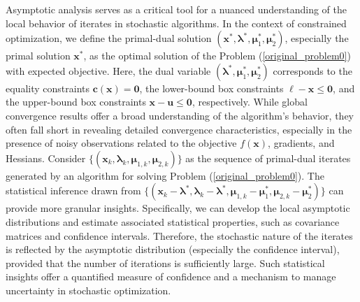 \documentclass[aos]{imsart}
\numberwithin{equation}{section}
\theoremstyle{plain}
\newcommand{\michael}[1]{\textcolor{red}{Michael:\ #1}}
\newcommand{\yihang}[1]{\textcolor{blue}{Yihang:\ #1}}
\begin{document}
Asymptotic analysis serves as a critical tool for a nuanced understanding of the local behavior of iterates in stochastic algorithms. In the context of constrained optimization, we define the primal-dual solution $(\bm{x}^{*}, \bm{\lambda}^{*}, \bm{\mu}_1^{*}, \bm{\mu}_2^{*})$, especially the primal solution $\bm{x}^{*}$, as the optimal solution of the Problem (\ref{original_problem0}) with expected objective. 
Here, the dual variable $(\bm{\lambda}^{*}, \bm{\mu}_1^{*}, \bm{\mu}_2^{*})$ corresponds to the equality constraints $\bm{c}(\bm{x}) = \bm{0}$, the lower-bound box constraints $\bm{\ell} - \bm{x} \leq \bm{0}$, and the upper-bound box constraints  $\bm{x} - \bm{u} \leq \bm{0}$, respectively. 
While global convergence results offer a broad understanding of the algorithm's behavior, they often fall short in revealing detailed convergence characteristics, especially in the presence of noisy observations related to the objective \(f(\bm{x})\), gradients, and Hessians.
Consider $\{(\bm{x}_k, \bm{\lambda}_{k}, \bm{\mu}_{1,k}, \bm{\mu}_{2,k})\}$ as the sequence of primal-dual iterates generated by an algorithm for solving Problem (\ref{original_problem0}). The statistical inference drawn from $\{(\bm{x}_k - \bm{\lambda}^{*}, \bm{\lambda}_{k} - \bm{\lambda}^{*}, \bm{\mu}_{1,k} - \bm{\mu}_1^{*}, \bm{\mu}_{2,k} - \bm{\mu}_2^{*})\}$ 
can provide more granular insights.
Specifically, we can develop the local asymptotic distributions and estimate associated statistical properties, such as covariance matrices and confidence intervals. 
Therefore, the stochastic nature of the iterates is reflected by the asymptotic distribution (especially the confidence interval), provided that the number of iterations is sufficiently large. 
Such statistical insights offer a quantified measure of confidence and a mechanism to manage uncertainty in stochastic optimization. 
\end{document}
